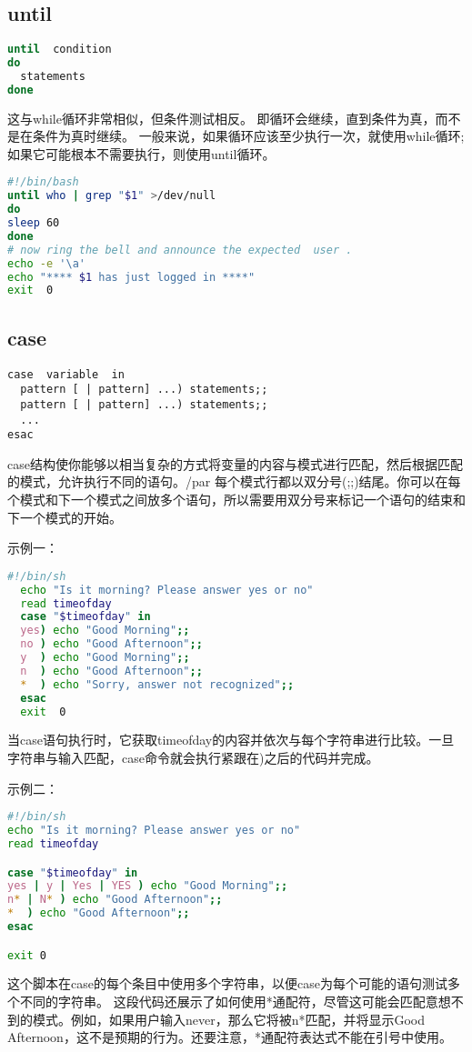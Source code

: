 \documentclass[a4paper]{ctexart}
\begin{document}
\subsection{until}
\begin{lstlisting}[language=sh]
until  condition
do
  statements
done
\end{lstlisting}

这与while循环非常相似，但条件测试相反。
即循环会继续，直到条件为真，而不是在条件为真时继续。
一般来说，如果循环应该至少执行一次，就使用while循环;如果它可能根本不需要执行，则使用until循环。 
\begin{lstlisting}[language=sh]
#!/bin/bash
until who | grep "$1" >/dev/null
do
sleep 60
done
# now ring the bell and announce the expected  user .
echo -e '\a'
echo "**** $1 has just logged in ****"
exit  0
\end{lstlisting}

\subsection{case}
\begin{lstlisting}
case  variable  in
  pattern [ | pattern] ...) statements;;
  pattern [ | pattern] ...) statements;;
  ...
esac
\end{lstlisting}

case结构使你能够以相当复杂的方式将变量的内容与模式进行匹配，然后根据匹配的模式，允许执行不同的语句。/par
每个模式行都以双分号(;;)结尾。你可以在每个模式和下一个模式之间放多个语句，所以需要用双分号来标记一个语句的结束和下一个模式的开始。

示例一：
\begin{lstlisting}[language=sh]
  #!/bin/sh
  echo "Is it morning? Please answer yes or no"
  read timeofday
  case "$timeofday" in
  yes) echo "Good Morning";;
  no ) echo "Good Afternoon";;
  y  ) echo "Good Morning";;
  n  ) echo "Good Afternoon";;
  *  ) echo "Sorry, answer not recognized";;
  esac
  exit  0
\end{lstlisting}
当case语句执行时，它获取timeofday的内容并依次与每个字符串进行比较。一旦字符串与输入匹配，case命令就会执行紧跟在)之后的代码并完成。

示例二：
\begin{lstlisting}[language=sh]
#!/bin/sh
echo "Is it morning? Please answer yes or no"
read timeofday

case "$timeofday" in
yes | y | Yes | YES ) echo "Good Morning";;
n* | N* ) echo "Good Afternoon";;
*  ) echo "Good Afternoon";;
esac

exit 0
\end{lstlisting}
这个脚本在case的每个条目中使用多个字符串，以便case为每个可能的语句测试多个不同的字符串。
这段代码还展示了如何使用*通配符，尽管这可能会匹配意想不到的模式。例如，如果用户输入never，那么它将被n*匹配，并将显示Good Afternoon，这不是预期的行为。还要注意，*通配符表达式不能在引号中使用。
\end{document}
